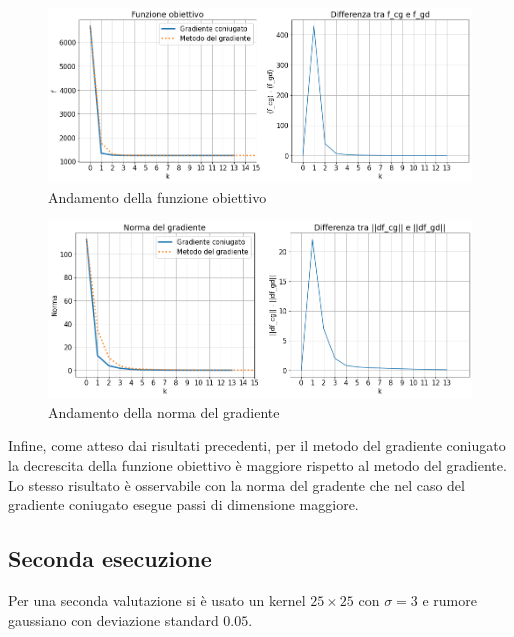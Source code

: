 \documentclass[11pt]{article}
\begin{document}
\begin{figure}[H]
    \centering
    \includegraphics[width=14cm]{iterazioni_cg_gd/1/funzione_obiettivo.png}
    \caption{Andamento della funzione obiettivo}
    \label{fig:obiettivo1}
\end{figure}
\begin{figure}[H]
    \centering
    \includegraphics[width=14cm]{iterazioni_cg_gd/1/norma_gradiente.png}
    \caption{Andamento della norma del gradiente}
    \label{fig:gradiente1}
\end{figure}
Infine, come atteso dai risultati precedenti, per il metodo del gradiente coniugato la decrescita della funzione obiettivo è maggiore rispetto al metodo del gradiente. 
Lo stesso risultato è osservabile con la norma del gradente che nel caso del gradiente coniugato esegue passi di dimensione maggiore.

\subsection{Seconda esecuzione}
Per una seconda valutazione si è usato un kernel $25 \times 25$ con $\sigma=3$ e rumore gaussiano con deviazione standard $0.05$.\\
\end{document}
